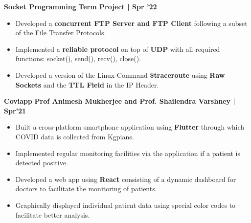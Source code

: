 \documentclass[10pt]{article}
\begin{document}
\vspace{-0.5ex}    
\large {\textbf{Socket Programming}} \normalsize \href{https://github.com/Abhitipu/Networks-CS39006}{\faGithub} {\hfill}\textbf{Term Project | Spr '22}\\[-1.7em]
\begin{itemize}
    \item Developed a \textbf{concurrent FTP Server and FTP Client} following a subset of the File Transfer Protocols.\\[-1.9em] 
    \item  Implemented a \textbf{reliable protocol} on top of \textbf{UDP} with all required functions: socket(), send(), recv(), close().\\[-1.9em]
    \item Developed a version of the Linux-Command \textbf{\$traceroute} using \textbf{Raw Sockets} and the \textbf{TTL Field} in the IP Header.
\end{itemize}
\vspace{-0.5ex}
\large {\textbf{Coviapp}} \normalsize  \href{https://github.com/coviapp} {\hspace{0.5ex}\faGithub} {\hfill} \textbf{Prof Animesh Mukherjee and Prof. Shailendra Varshney | Spr'21}\\[-1.75em]
\begin{itemize}
    \item Built a cross-platform smartphone application using \textbf{Flutter} through which COVID data is collected from Kgpians.\\[-1.9em]
    \item Implemented regular monitoring facilities via the application if a patient is detected positive. \\[-1.9em]
    \item Developed a web app using \textbf{React} consisting of a dynamic dashboard for doctors to facilitate the monitoring of patients.\\[-1.9em]
    \item Graphically displayed individual patient data using special color codes to facilitate better analysis.
\end{itemize}
\end{document}
